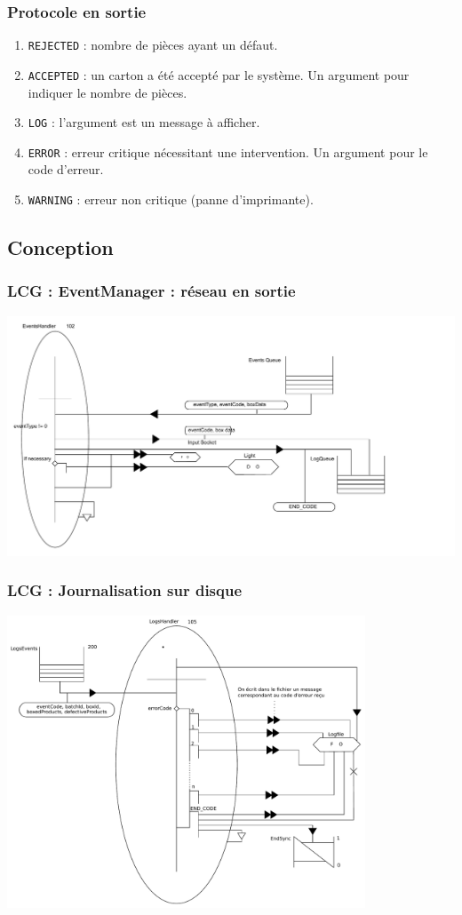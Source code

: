 \documentclass{beamer}
\begin{document}
	\begin{frame}
		\frametitle{Protocole en sortie}
		\begin{enumerate}
			\item \texttt{REJECTED} : nombre de pièces ayant un défaut.
			\item \texttt{ACCEPTED} : un carton a été accepté par le système. Un argument pour indiquer le nombre de pièces.
			\item \texttt{LOG} : l'argument est un message à afficher.
			\item \texttt{ERROR} : erreur critique nécessitant une intervention. Un argument pour le code d'erreur.
			\item \texttt{WARNING} : erreur non critique (panne d'imprimante).
		\end{enumerate}
	\end{frame}

	
	\subsection{Conception}
	\begin{frame}
	    \frametitle{LCG : EventManager : réseau en sortie}
	    \includegraphics[width=\textwidth]{../../SchemasLCG/src/EventsManager.pdf}
	\end{frame}

	\begin{frame}
	    \frametitle{LCG : Journalisation sur disque}
	    \includegraphics[width=0.8\textwidth]{../../SchemasLCG/LogsManager.pdf}
	\end{frame}
\end{document}
